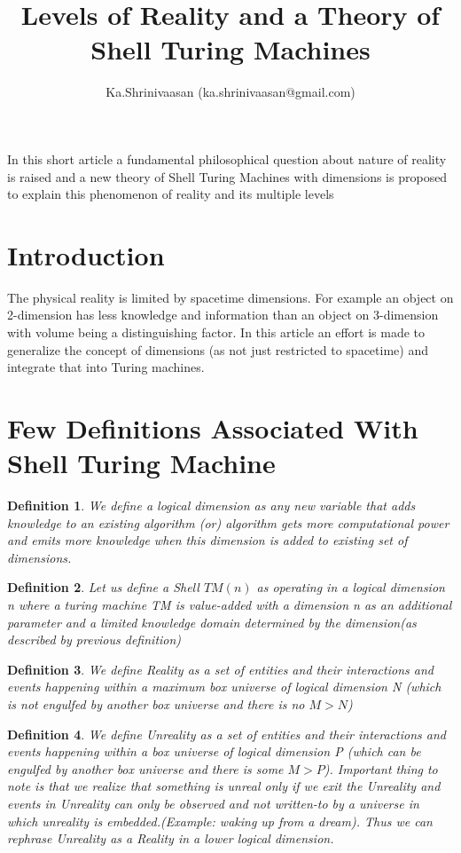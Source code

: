 \documentclass[11pt,onecolumn]{article}
\author{ Ka.Shrinivaasan (ka.shrinivaasan@gmail.com) }
\title{Levels of Reality and a Theory of Shell Turing Machines}
\newtheorem{defn}{Definition}
\begin{document}
\thispagestyle{empty}
\pagestyle{empty}
\maketitle
\begin{onecolabstract}
In this short article a fundamental philosophical question about nature of reality is raised and a new theory of Shell Turing Machines with dimensions is proposed to explain this phenomenon of reality and its multiple levels
\end{onecolabstract}

\section{Introduction}
The physical reality is limited by spacetime dimensions. For example an object on 2-dimension has less knowledge and information than an object on 3-dimension with volume being a distinguishing factor. In this article an effort is made to generalize the concept of dimensions (as not just restricted to spacetime) and integrate that into Turing machines.

\section{Few Definitions Associated With Shell Turing Machine}

\begin{defn}
We define a logical dimension as any new variable that adds knowledge to an existing algorithm (or) algorithm gets more computational power and emits more knowledge when this dimension is added to existing set of dimensions. 
\end{defn}

\begin{defn}
Let us define a Shell $TM(n)$ as operating in a logical dimension n where a turing machine TM is value-added with a dimension n as an additional parameter and a limited knowledge domain determined by the dimension(as described by previous definition) 
\end{defn}

\begin{defn}
We define Reality as a set of entities and their interactions and events happening within a maximum box universe of logical dimension N (which is not engulfed by another box universe and there is no $M > N$)
\end{defn}

\begin{defn}
We define Unreality as a set of entities and their interactions and events happening within a box universe of logical dimension P (which can be engulfed by another box universe and there is some $M > P$). Important thing to note is that we realize that something is unreal only if we exit the Unreality and events in Unreality can only be observed and not written-to by a universe in which unreality is embedded.(Example: waking up from a dream). Thus we can rephrase Unreality as a Reality in a lower logical dimension.
\end{defn}
\end{document}

